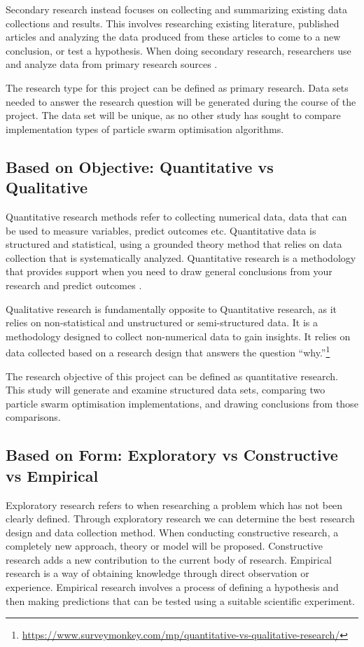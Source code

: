 \documentclass[oneside,12pt]{book}
\begin{document}
Secondary research instead focuses on collecting and summarizing existing data collections and results. This involves researching existing literature, published articles and analyzing the data produced from these articles to come to a new conclusion, or test a hypothesis. When doing secondary research, researchers use and analyze data from primary research sources \cite{bouchrika_2020}. 

The research type for this project can be defined as primary research. Data sets needed to answer the research question will be generated during the course of the project. The data set will be unique, as no other study has sought to compare implementation types of particle swarm optimisation algorithms. 

\subsection{Based on Objective: Quantitative vs Qualitative}
Quantitative research methods refer to collecting numerical data, data that can be used to measure variables, predict outcomes etc. Quantitative data is structured and statistical, using a grounded theory method that relies on data collection that is systematically analyzed. Quantitative research is a methodology that provides support when you need to draw general conclusions from your research and predict outcomes \cite{mcleod_2019}. 

Qualitative research is fundamentally opposite to Quantitative research, as it relies on non-statistical and unstructured or semi-structured data. It is a methodology designed to collect non-numerical data to gain insights. It relies on data collected based on a research design that answers the question “why.”\footnote{\url{https://www.surveymonkey.com/mp/quantitative-vs-qualitative-research/}}

The research objective of this project can be defined as quantitative research. This study will generate and examine structured data sets, comparing two particle swarm optimisation implementations, and drawing conclusions from those comparisons. 
\subsection{Based on Form: Exploratory vs Constructive vs Empirical}
Exploratory research refers to when researching a problem which has not been clearly defined. Through exploratory research we can determine the best research design and data collection method. 
When conducting constructive research, a completely new approach, theory or model will be proposed. Constructive research adds a new contribution to the current body of research. 
Empirical research is a way of obtaining knowledge through direct observation or experience. Empirical research involves a process of defining a hypothesis and then making predictions that can be tested using a suitable scientific experiment. 
\end{document}
